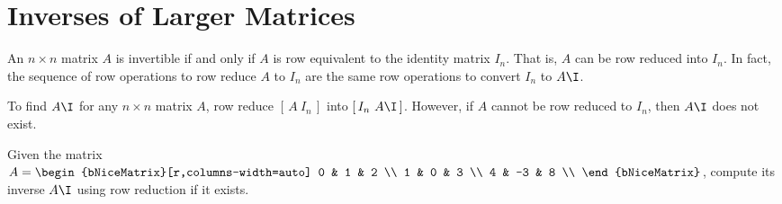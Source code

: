 
\section{Inverses of Larger Matrices}
\label{sec:inverses_of_larger_matrices}

\begin{theorem}
  \label{thm:invertible_matrix_theorem}

  An $n \times n$ matrix $A$ is invertible if and only if $A$ is row equivalent
  to the identity matrix $I_n$. That is, $A$ can be row reduced into $I_n$. In
  fact, the sequence of row operations to row reduce $A$ to $I_n$ are the same
  row operations to convert $I_n$ to $A\I$.
\end{theorem}

\begin{purpleframe}
  \label{prpl:method_for_finding_a_inverse}

  To find $A\I$ for any $n \times n$ matrix $A$, row reduce $[\,A~I_n\,]$ into
  $[\,I_n~A\I\,]$. However, if $A$ cannot be row reduced to $I_n$, then $A\I$
  does not exist.
\end{purpleframe}

\begin{question}
  \label{qst:finding_a_inverse_with_row_reduction}

  Given the matrix $A =
  \begin{bNiceMatrix}[r,columns-width=auto]
    0 & 1 & 2 \\
    1 & 0 & 3 \\
    4 & -3 & 8 \\
  \end{bNiceMatrix}$, compute its inverse $A\I$ using row reduction if it
  exists.
\end{question}

